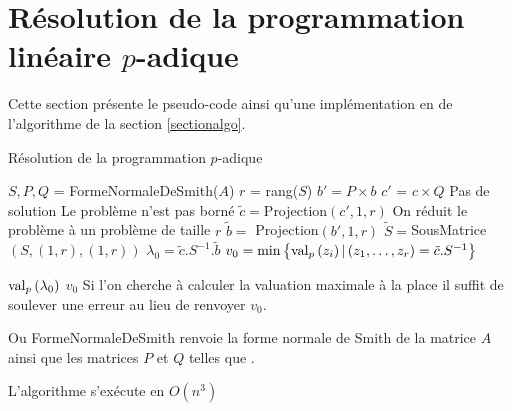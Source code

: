 \section{Résolution de la programmation linéaire \texorpdfstring{$p$}{p}-adique} 
\label{appendixalgo} 
Cette section présente le pseudo-code ainsi qu'une implémentation en \sage de l'algorithme de la section \ref{sectionalgo}.
 

\begin{algorithm}
\caption{Résolution de la programmation $p$-adique}
\begin{algorithmic}[0]
\State $S,P,Q$ = FormeNormaleDeSmith($A$)
\State $r$ = rang($S$)
\State $b' = P \times b$
\State $c'$ = $c \times Q$
\State Pas de solution
\EndIf
\EndFor
{} 
\State Le problème n'est pas borné
\EndIf
\EndFor
\State $\tilde{c} =$Projection$\left( c', 1, r \right) $ \Comment On réduit le problème à un problème de taille $r$ 
\State $\tilde{b} =$ Projection$\left(b', 1, r \right) $ 
\State $\tilde{S} = $SousMatrice$\left( S, (1,r),(1,r) \right) $
\State $\lambda_0 = \tilde{c}. S^{-1}. \tilde{b} $
\State $v_0 = \min \left\{\text{val}_p\left(z_{i}\right)| \left( z_1,\ldots,z_r \right) = \tilde{c}.S^{-1}  \right\}$

\Return $\text{val}_p\left( \lambda_0 \right)$
\Else \Return $v_0$ \Comment Si l'on cherche à calculer la valuation maximale à la place il suffit de soulever une erreur au lieu de renvoyer $v_0$.
\EndIf
\end{algorithmic}
\end{algorithm}

Ou FormeNormaleDeSmith renvoie la forme normale de Smith de la matrice $A$ ainsi que les matrices $P$ et $Q$ telles que . 

L'algorithme s'exécute en $O\left( n^3 \right) $
